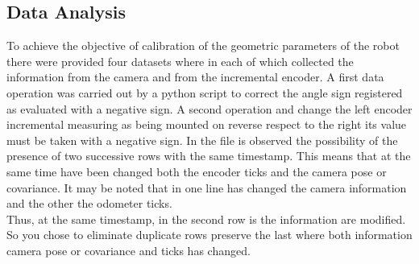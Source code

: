 \subsection{Data Analysis}
To achieve the objective of calibration of the geometric parameters of the robot there were provided four datasets where in each of which collected the information from the camera and from the incremental encoder.
A first data operation was carried out by a python script to correct the angle sign registered as evaluated with a negative sign.
A second operation and change the left encoder incremental measuring as being mounted on reverse respect to the right its value must be taken with a negative sign.
In the file is observed
the possibility of the presence of two successive rows with the same timestamp. This means that at the same time have been changed both the encoder ticks and the camera pose or covariance.
It may be noted that in one line has changed the camera information and the other the odometer ticks. \\Thus, at the same timestamp, in the second row is the information are modified.
So you chose to eliminate duplicate rows preserve the last where both information camera pose or covariance and ticks has changed.